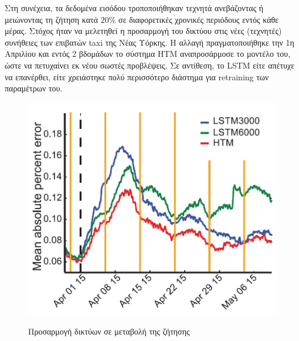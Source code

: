 Στη συνέχεια, τα δεδομένα εισόδου τροποποιήθηκαν τεχνητά ανεβάζοντας ή μειώνοντας τη ζήτηση κατά $20\%$ σε διαφορετικές χρονικές περιόδους εντός κάθε μέρας.
Στόχος ήταν να μελετηθεί η προσαρμογή του δικτύου στις νέες (τεχνητές) συνήθειες των επιβατών taxi της Νέας Υόρκης.
Η αλλαγή πραγματοποιήθηκε την 1η Απριλίου και εντός 2 βδομάδων το σύστημα HTM αναπροσάρμοσε το μοντέλο του, ώστε να πετυχαίνει εκ νέου σωστές προβλέψεις.
Σε αντίθεση, το LSTM είτε απέτυχε να επανέρθει, είτε χρειάστηκε πολύ περισσότερο διάστημα για retraining των παραμέτρων του.

\begin{figure}[h]
	\centering%
	{\includegraphics[width=0.4\columnwidth,clip=true]{figures/vlsi/taxi_adaptation.jpg}}
	\caption{Προσαρμογή δικτύων σε μεταβολή της ζήτησης}
	\label{fig:taxi-adaptation}
\end{figure}
